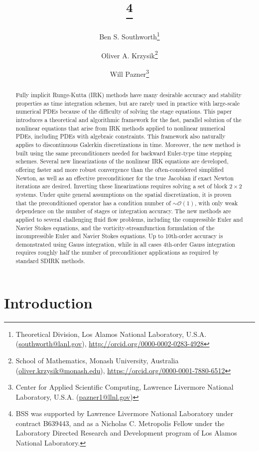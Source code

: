 \documentclass[review]{siamart}
\title{{\TheTitle}\thanks{BSS was supported by Lawrence Livermore National
      Laboratory under contract B639443, and as a Nicholas C. Metropolis Fellow
      under the Laboratory Directed Research and Development program of Los
      Alamos National Laboratory.
  }}
\author{Ben S. Southworth\thanks{Theoretical Division, Los Alamos National Laboratory,
    U.S.A. (\url{southworth@lanl.gov}),
    \url{http://orcid.org/0000-0002-0283-4928}}
    \and
    Oliver A. Krzysik\thanks{School of Mathematics, Monash University,
  	Australia (\url{oliver.krzysik@monash.edu}),
  	\url{https://orcid.org/0000-0001-7880-6512}}
  	\and
  	Will Pazner\thanks{Center for Applied Scientific Computing,
  	Lawrence Livermore National Laboratory,
    U.S.A. (\url{pazner1@llnl.gov})}
}
\begin{document}
\maketitle
\allowdisplaybreaks

\begin{abstract}
Fully implicit Runge-Kutta (IRK) methods have many desirable accuracy and
stability properties as time integration schemes, but are rarely used in
practice with large-scale numerical PDEs because of the difficulty of solving
the stage equations. This paper introduces a theoretical and algorithmic
framework for the fast, parallel solution of the nonlinear equations that arise
from IRK methods applied to nonlinear numerical PDEs, including PDEs with
algebraic constraints. This framework also naturally applies to discontinuous
Galerkin discretizations in time. Moreover, the new method is built using the
same preconditioners needed for backward Euler-type time stepping schemes.
Several new linearizations of the nonlinear IRK equations are developed,
offering faster and more robust convergence than the often-considered simplified
Newton, as well as an effective preconditioner for the true Jacobian if exact
Newton iterations are desired. Inverting these linearizations requires solving a
set of block $2\times 2$ systems. Under quite general assumptions on the spatial
discretization, it is proven that the preconditioned operator has a condition
number of $\sim\mathcal{O}(1)$, with only weak dependence on the number of
stages or integration accuracy. The new methods are applied to several
challenging fluid flow problems, including the compressible Euler and Navier
Stokes equations, and the vorticity-streamfunction formulation of the
incompressible Euler and Navier Stokes equations. Up to 10th-order accuracy is
demonstrated using Gauss integration, while in all cases 4th-order Gauss
integration requires roughly half the number of preconditioner applications as
required by standard SDIRK methods.
\end{abstract}


\section{Introduction}\label{sec:intro}
\end{document}
